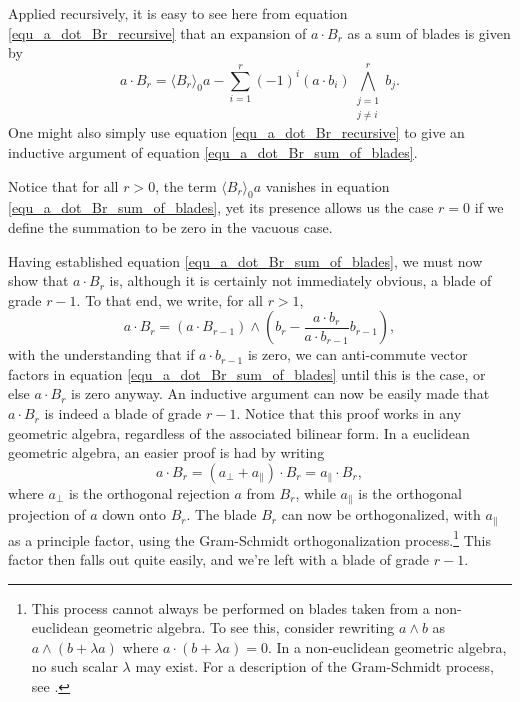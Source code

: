 \documentclass{birkjour}
\theoremstyle{definition}
\theoremstyle{remark}
\numberwithin{equation}{section}
\begin{document}
Applied recursively, it is easy to see here from equation \eqref{equ_a_dot_Br_recursive} that an expansion of
$a\cdot B_r$ as a sum of blades is given by
\begin{equation}\label{equ_a_dot_Br_sum_of_blades}
a\cdot B_r = \langle B_r\rangle_0a - \sum_{i=1}^r(-1)^i(a\cdot b_i)\bigwedge_{\substack{j=1\\j\neq i}}^r b_j.
\end{equation}
One might also simply use equation \eqref{equ_a_dot_Br_recursive} to give an inductive
argument of equation \eqref{equ_a_dot_Br_sum_of_blades}.

Notice that for all $r>0$, the term $\langle B_r\rangle_0a$ vanishes in equation \eqref{equ_a_dot_Br_sum_of_blades},
yet its presence allows us the case $r=0$ if we define the summation to be zero in the vacuous case.

Having established equation \eqref{equ_a_dot_Br_sum_of_blades}, we must now show that $a\cdot B_r$ is,
although it is certainly not immediately obvious, a blade of grade $r-1$.  To that end, we write, for all $r>1$,
\begin{equation*}
a\cdot B_r = (a\cdot B_{r-1})\wedge\left(b_r - \frac{a\cdot b_r}{a\cdot b_{r-1}}b_{r-1}\right),
\end{equation*}
with the understanding that if $a\cdot b_{r-1}$ is zero, we can anti-commute vector factors in equation \eqref{equ_a_dot_Br_sum_of_blades}
until this is the case, or else $a\cdot B_r$ is zero anyway.
An inductive argument can now be easily made that $a\cdot B_r$ is indeed a blade of grade $r-1$.
Notice that this proof works in any geometric algebra, regardless of the associated bilinear form.  In a euclidean geometric
algebra, an easier proof is had by writing
\begin{equation*}
a\cdot B_r = (a_{\perp} + a_{\parallel})\cdot B_r = a_{\parallel}\cdot B_r,
\end{equation*}
where $a_{\perp}$ is the orthogonal rejection $a$ from $B_r$, while $a_{\parallel}$ is the
orthogonal projection of $a$ down onto $B_r$.  The blade $B_r$ can now be orthogonalized,
with $a_{\parallel}$ as a principle factor, using the Gram-Schmidt orthogonalization process.\footnote{This process
cannot always be performed on blades taken from a non-euclidean geometric algebra.  To see this, consider rewriting
$a\wedge b$ as $a\wedge(b+\lambda a)$ where $a\cdot(b+\lambda a)=0$.  In a non-euclidean geometric algebra,
no such scalar $\lambda$ may exist.  For a description of the Gram-Schmidt process, see \cite{}.}
This factor then falls out quite easily, and we're left with a blade of grade $r-1$.
\end{document}
